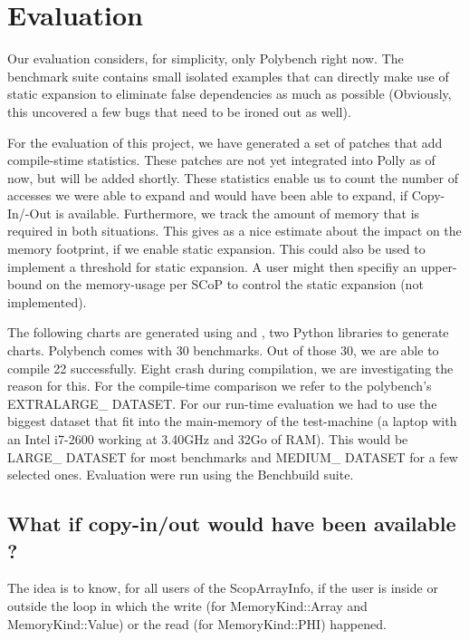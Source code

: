 \chapter{Evaluation}\label{ch:Evaluation}

Our evaluation considers, for simplicity, only Polybench\cite{Polybench} right now. The benchmark suite contains small isolated examples that can directly make use of static expansion to eliminate false dependencies as much as possible (Obviously, this uncovered a few bugs that need to be ironed out as well).

For the evaluation of this project, we have generated a set of patches that add compile-stime statistics. These patches are not yet integrated into Polly as of now, but will be added shortly. These statistics enable us to count the number of accesses we were able to expand and would have been able to expand, if Copy-In/-Out is available. Furthermore, we track the amount of memory that is required in both situations. This gives as a nice estimate about the impact on the memory footprint, if we enable static expansion. This could also be used to implement a threshold for static expansion. A user might then specifiy an upper-bound on the memory-usage per SCoP to control the static expansion (not implemented).

The following charts are generated using  and , two Python libraries to generate charts. Polybench comes with 30 benchmarks. Out of those 30, we are able to compile 22 successfully. Eight crash during compilation, we are investigating the reason for this. For the compile-time comparison we refer to the polybench’s EXTRALARGE\_ DATASET. For our run-time evaluation we had to use the biggest dataset that fit into the main-memory of the test-machine (a laptop with an Intel i7-2600 working at 3.40GHz and 32Go of RAM). This would be LARGE\_ DATASET for most benchmarks and MEDIUM\_ DATASET for a few selected ones. Evaluation were run using the Benchbuild suite\cite{Benchbuild}.

\section{What if copy-in/out would have been available ?}
The idea is to know, for all users of the ScopArrayInfo, if the user is inside or outside the loop in which the write (for MemoryKind::Array and MemoryKind::Value) or the read (for MemoryKind::PHI) happened.


